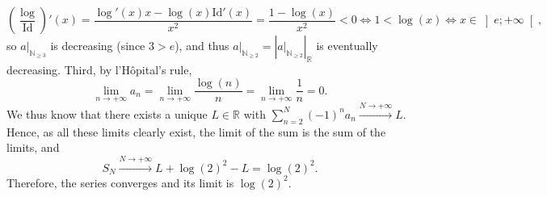 \begin{solution}
    \[
    \left(\frac{\log}{\mathrm{Id}}\right)'\left(x\right) = \frac{\log'\left(x\right)x-\log\left(x\right)\mathrm{Id}'\left(x\right)}{x^2} = \frac{1-\log\left(x\right)}{x^2} < 0 \Leftrightarrow 1 < \log\left(x\right) \Leftrightarrow x \in \left]e;+\infty\right[,
    \]
    so \( a|_{\mathbb{N}_{\geq 3}} \) is decreasing (since \( 3 > e \)), and thus \( a|_{\mathbb{N}_{\geq 2}} = \left|a|_{\mathbb{N}_{\geq 2}}\right|_{\mathbb{R}} \) is eventually decreasing. Third, by l'H\^opital's rule,
    \[
        \lim_{n \to +\infty} a_n = \lim_{n \to +\infty} \frac{\log\left(n\right)}{n} = \lim_{n \to +\infty} \frac{1}{n} = 0.
    \]
    We thus know that there exists a unique \( L \in \mathbb{R} \) with \( \sum_{n=2}^{N} \left(-1\right)^n a_n \overset{N \to +\infty}{\longrightarrow} L \). Hence, as all these limits clearly exist, the limit of the sum is the sum of the limits, and
    \[
        S_N \overset{N \to +\infty}{\longrightarrow} L+\log\left(2\right)^2-L = \log\left(2\right)^2.
    \]
    Therefore, the series converges and its limit is \( \log\left(2\right)^2 \).
\end{solution}
